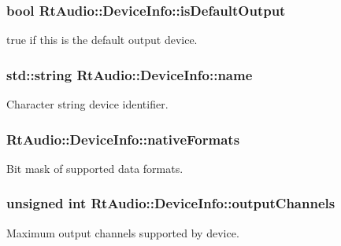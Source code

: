 \subsubsection[{is\+Default\+Output}]{\setlength{\rightskip}{0pt plus 5cm}bool Rt\+Audio\+::\+Device\+Info\+::is\+Default\+Output}\hypertarget{struct_rt_audio_1_1_device_info_a5365245e73ffe29a05734de4474acd58}{}\label{struct_rt_audio_1_1_device_info_a5365245e73ffe29a05734de4474acd58}
true if this is the default output device. 
\subsubsection[{name}]{\setlength{\rightskip}{0pt plus 5cm}std\+::string Rt\+Audio\+::\+Device\+Info\+::name}\hypertarget{struct_rt_audio_1_1_device_info_a24df596ab8d54f2eb540c7cf16212b3b}{}\label{struct_rt_audio_1_1_device_info_a24df596ab8d54f2eb540c7cf16212b3b}
Character string device identifier. 
\subsubsection[{native\+Formats}]{ Rt\+Audio\+::\+Device\+Info\+::native\+Formats}\hypertarget{struct_rt_audio_1_1_device_info_a23251b549b89b2fe04a57fcd7cb76ea4}{}\label{struct_rt_audio_1_1_device_info_a23251b549b89b2fe04a57fcd7cb76ea4}
Bit mask of supported data formats. 
\subsubsection[{output\+Channels}]{\setlength{\rightskip}{0pt plus 5cm}unsigned int Rt\+Audio\+::\+Device\+Info\+::output\+Channels}\hypertarget{struct_rt_audio_1_1_device_info_a81aaf488f8158ef55b1bb678f66feb7d}{}\label{struct_rt_audio_1_1_device_info_a81aaf488f8158ef55b1bb678f66feb7d}
Maximum output channels supported by device. 

